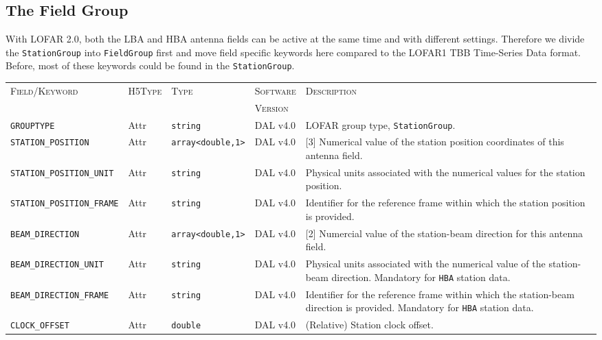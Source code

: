 \documentclass[a4paper,10pt,bibtotoc]{scrartcl}
\begin{document}
\subsection{The Field Group}
\label{sec:field group}

With LOFAR 2.0, both the LBA and HBA antenna fields can be active at the same time and with different settings. Therefore we divide the \texttt{StationGroup} into \texttt{FieldGroup} first and move field specific keywords here compared to the LOFAR1 TBB Time-Series Data format. Before, most of these keywords could be found in the \texttt{StationGroup}.

\begin{table}[htbp]
  \centering
  \begin{tabular}{|llllp{4.5cm}|}
    \hline
    \textsc{Field/Keyword} & \textsc{H5Type} & \textsc{Type} & \textsc{Software} & \textsc{Description} \\
                           &                 &               & \textsc{Version}  &                      \\
    \hline
    \hline
    \small {\texttt{GROUPTYPE}} & Attr & \verb|string| & DAL v4.0 & LOFAR group type, \texttt{StationGroup}. \\
    \small {\texttt{STATION\_POSITION}} & Attr & \verb|array<double,1>| & DAL v4.0 & [3] Numerical value of the station position coordinates of this antenna field. \\
    \small {\texttt{STATION\_POSITION\_UNIT}}  & Attr & \verb|string| & DAL v4.0 & Physical units associated with the numerical values for the station position. \\
    \small {\texttt{STATION\_POSITION\_FRAME}} & Attr & \verb|string| & DAL v4.0 & Identifier for the reference frame within which the station position is provided. \\
    \small {\texttt{BEAM\_DIRECTION}} & Attr & \verb|array<double,1>| & DAL v4.0 & [2] Numercial value of the station-beam direction for this antenna field. \\
    \small {\texttt{BEAM\_DIRECTION\_UNIT}}  & Attr & \verb|string| & DAL v4.0 & Physical units associated with the numerical value of the station-beam direction. Mandatory for \verb|HBA| station data.\\
    \small {\texttt{BEAM\_DIRECTION\_FRAME}} & Attr & \verb|string| & DAL v4.0 & Identifier for the reference frame within which the station-beam direction is provided. Mandatory for \verb|HBA| station data.\\
    \small {\texttt{CLOCK\_OFFSET}} & Attr & \verb|double| & DAL v4.0 & (Relative) Station clock offset. \\

\end{tabular}
\end{table}
\end{document}
